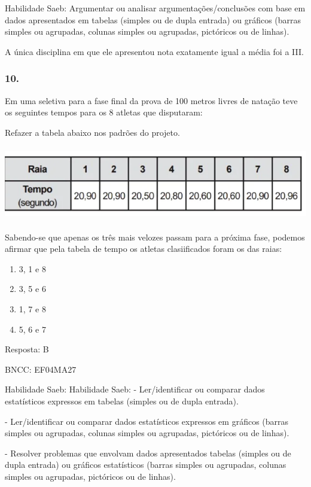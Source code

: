 Habilidade Saeb: Argumentar ou analisar argumentações/conclusões com
base em dados apresentados em tabelas (simples ou de dupla entrada) ou
gráficos (barras simples ou agrupadas, colunas simples ou agrupadas,
pictóricos ou de linhas).

A única disciplina em que ele apresentou nota exatamente igual a média
foi a III.

\subsubsection{10.}\label{section-181}

Em uma seletiva para a fase final da prova de 100 metros livres de
natação teve os seguintes tempos para os 8 atletas que disputaram:

Refazer a tabela abaixo nos padrões do projeto.

\includegraphics[width=5.90556in,height=1.27708in]{media/image161.png}

Sabendo-se que apenas os três mais velozes passam para a próxima fase,
podemos afirmar que pela tabela de tempo os atletas clasiificados foram
os das raias:

\begin{enumerate}
\def\labelenumi{\alph{enumi})}
\item
  3, 1 e 8
\item
  3, 5 e 6
\item
  1, 7 e 8
\item
  5, 6 e 7
\end{enumerate}

Resposta: B

BNCC: EF04MA27

Habilidade Saeb: Habilidade Saeb: - Ler/identificar ou comparar dados
estatísticos expressos em tabelas (simples ou de dupla entrada).

- Ler/identificar ou comparar dados estatísticos expressos em gráficos
(barras simples ou agrupadas, colunas simples ou agrupadas, pictóricos
ou de linhas).

- Resolver problemas que envolvam dados apresentados tabelas (simples ou
de dupla entrada) ou gráficos estatísticos (barras simples ou agrupadas,
colunas simples ou agrupadas, pictóricos ou de linhas).

